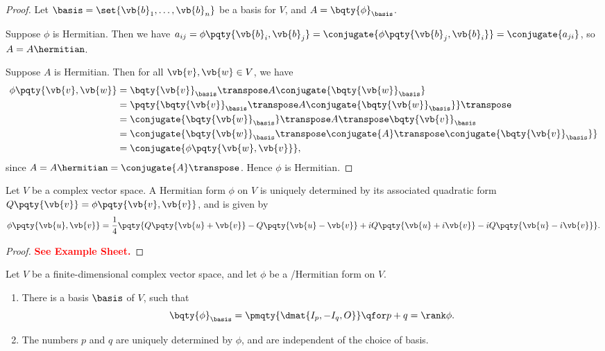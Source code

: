 \begin{proof}
    Let \(\basis = \set{\vb{b}_1, \ldots, \vb{b}_n}\) be a basis for \(V\), and \(A = \bqty{\phi}_{\basis}\).

    Suppose \(\phi\) is Hermitian. Then we have \(a_{ij} = \phi\pqty{\vb{b}_i, \vb{b}_j} = \conjugate{\phi\pqty{\vb{b}_j, \vb{b}_i}} = \conjugate{a_{ji}}\), so \(A = A\hermitian\).

    Suppose \(A\) is Hermitian. Then for all \(\vb{v}, \vb{w} \in V\), we have
    \begin{align*}
        \phi\pqty{\vb{v}, \vb{w}} &= \bqty{\vb{v}}_{\basis} \transpose A \conjugate{\bqty{\vb{w}}_{\basis}} \\
        &= \pqty{\bqty{\vb{v}}_{\basis} \transpose A \conjugate{\bqty{\vb{w}}_{\basis}}}\transpose \\
        &= \conjugate{\bqty{\vb{w}}_{\basis}} \transpose A\transpose \bqty{\vb{v}}_{\basis} \\
        &= \conjugate{\bqty{\vb{w}}_{\basis}\transpose \conjugate{A}\transpose \conjugate{\bqty{\vb{v}}_{\basis}}} \\
        &= \conjugate{\phi\pqty{\vb{w}, \vb{v}}},
    \end{align*}
    since \(A = A\hermitian = \conjugate{A}\transpose\). Hence \(\phi\) is Hermitian.
\end{proof}

\begin{proposition}
    \label{prop:polarisation-identity-hermitian-sesquilinear-forms}%
    Let \(V\) be a complex vector space. A Hermitian form \(\phi\) on \(V\) is uniquely determined by its associated quadratic form \(Q\pqty{\vb{v}} = \phi\pqty{\vb{v}, \vb{v}}\), and is given by
    \[
        \phi\pqty{\vb{u}, \vb{v}} = \frac{1}{4} \pqty{Q\pqty{\vb{u} + \vb{v}} - Q\pqty{\vb{u} - \vb{v}} + i Q\pqty{\vb{u} + i \vb{v}} - i Q\pqty{\vb{u} - i \vb{v}}}.
    \]
\end{proposition}

\begin{proof}
    \textbf{\textcolor{red}{See Example Sheet.}}
\end{proof}

\begin{theorem}
    Let \(V\) be a finite-dimensional complex vector space, and let \(\phi\) be a /Hermitian form on \(V\).

    \begin{enumerate}[label=(\roman*)]
        \item There is a basis \(\basis\) of \(V\), such that
        \[
            \bqty{\phi}_{\basis} = \pmqty{\dmat{I_p, -I_q, O}} \qfor p + q = \rank \phi.
        \]

        \item {} The numbers \(p\) and \(q\) are uniquely determined by \(\phi\), and are independent of the choice of basis.
    \end{enumerate}
\end{theorem}

